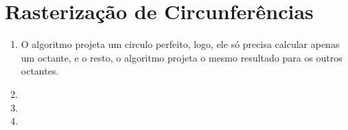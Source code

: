 \section*{Rasterização de Circunferências}

	\begin{enumerate} \addtocounter{enumi}{15}
		\item 
		O algoritmo projeta um circulo perfeito, logo, ele só precisa calcular apenas um
		octante, e o resto, o algoritmo projeta o mesmo resultado para os outros octantes.
		
		\item 

		\item 

		\item 

	\end{enumerate}
